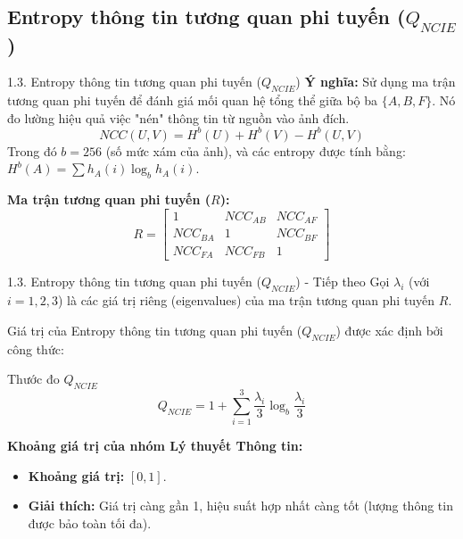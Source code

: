 \documentclass{beamer}
\begin{document}
\subsection{Entropy thông tin tương quan phi tuyến ($Q_{NCIE}$)}
\begin{frame}{1.3. Entropy thông tin tương quan phi tuyến ($Q_{NCIE}$)}
    \textbf{Ý nghĩa:} Sử dụng ma trận tương quan phi tuyến để đánh giá mối quan hệ tổng thể giữa bộ ba $\{A, B, F\}$. Nó đo lường hiệu quả việc "nén" thông tin từ nguồn vào ảnh đích.
    \begin{equation}
        NCC(U,V) = H^b(U) + H^b(V) - H^b(U,V)
    \end{equation}
    Trong đó $b=256$ (số mức xám của ảnh), và các entropy được tính bằng:
    $H^b(A) = \sum h_A(i)\log_b h_A(i)$.

    \vspace{0.3cm}
    \textbf{Ma trận tương quan phi tuyến ($R$):}
    \begin{equation}
        R = \begin{bmatrix}
            1 & NCC_{AB} & NCC_{AF} \\
            NCC_{BA} & 1 & NCC_{BF} \\
            NCC_{FA} & NCC_{FB} & 1
        \end{bmatrix}
    \end{equation}
\end{frame}

\begin{frame}{1.3. Entropy thông tin tương quan phi tuyến ($Q_{NCIE}$) - Tiếp theo}
    Gọi $\lambda_i$ (với $i=1, 2, 3$) là các giá trị riêng (eigenvalues) của ma trận tương quan phi tuyến $R$.

    \vspace{0.5cm}
    Giá trị của Entropy thông tin tương quan phi tuyến ($Q_{NCIE}$) được xác định bởi công thức:

    \begin{block}{Thước đo $Q_{NCIE}$}
    \begin{equation}
        Q_{NCIE} = 1 + \sum_{i=1}^3 \frac{\lambda_i}{3} \log_b \frac{\lambda_i}{3}
    \end{equation}
    \end{block}

    \vspace{0.4cm}
    \textbf{Khoảng giá trị của nhóm Lý thuyết Thông tin:}
    \begin{itemize}
        \item \textbf{Khoảng giá trị:} $[0, 1]$.
        \item \textbf{Giải thích:} Giá trị càng gần 1, hiệu suất hợp nhất càng tốt (lượng thông tin được bảo toàn tối đa).
    \end{itemize}
\end{frame}
\end{document}
